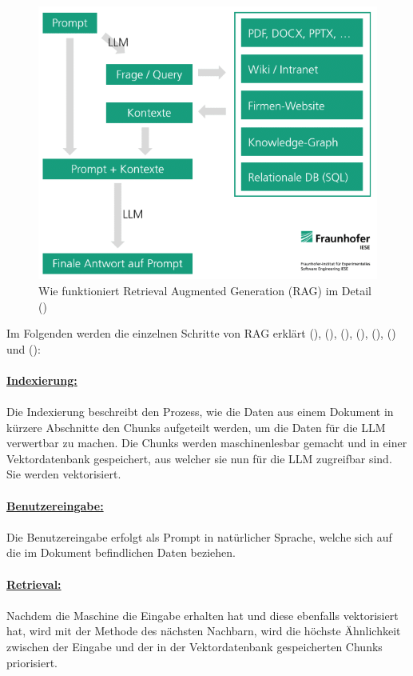 \documentclass[12pt,toc=bib,toc=listof]{scrreprt}
\begin{document}
\begin{figure} [H]
    \centering
    \includegraphics[width=0.75\linewidth]{./Bilder/Honroth_Wie funktioniert Retrieval Augmented Generation (RAG) im Detail.png}
    \caption{Wie funktioniert Retrieval Augmented Generation (RAG) im Detail (\cite{Honroth2024})}
    \label{fig:enter-label}
\end{figure}
\noindent Im Folgenden werden die einzelnen Schritte von RAG erklärt (\cite{Gao2024}), (\cite{Honroth2024}), (\cite{Lewis2021}), (\cite{Miesle2023}), (\cite{Salemi2024}), (\cite{Schmid2024}) und (\cite{Wu2024}):\\
\\
\textbf{\underline{Indexierung:}}\\
\\
Die Indexierung beschreibt den Prozess, wie die Daten aus einem Dokument in kürzere Abschnitte den Chunks aufgeteilt werden, um die Daten für die LLM verwertbar zu machen. Die Chunks werden maschinenlesbar gemacht und in einer Vektordatenbank gespeichert, aus welcher sie nun für die LLM zugreifbar sind. Sie werden vektorisiert.\\
\\
\textbf{\underline{Benutzereingabe:}}\\
\\
Die Benutzereingabe erfolgt als Prompt in natürlicher Sprache, welche sich auf die im Dokument befindlichen Daten beziehen.\\
\\
\textbf{\underline{Retrieval:}}\\
\\
Nachdem die Maschine die Eingabe erhalten hat und diese ebenfalls vektorisiert hat, wird mit der Methode des nächsten Nachbarn, wird die höchste Ähnlichkeit zwischen der Eingabe und der in der Vektordatenbank gespeicherten Chunks priorisiert.\\
\end{document}

